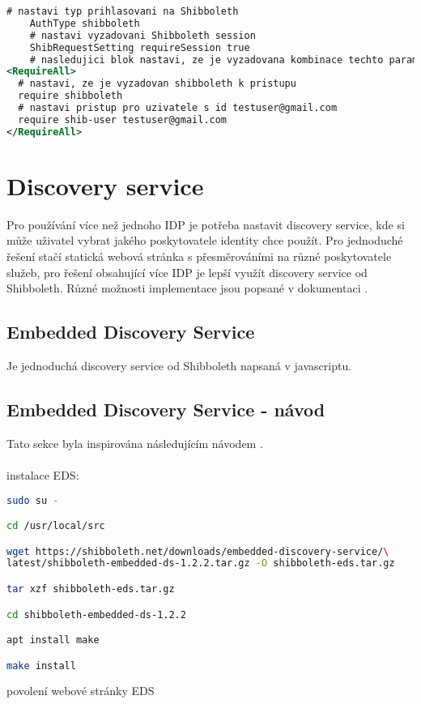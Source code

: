  \begin{lstlisting}[language=xml]
    # nastavi typ prihlasovani na Shibboleth
    AuthType shibboleth
    # nastavi vyzadovani Shibboleth session
    ShibRequestSetting requireSession true
    # nasledujici blok nastavi, ze je vyzadovana kombinace techto parametru
<RequireAll>
  # nastavi, ze je vyzadovan shibboleth k pristupu
  require shibboleth 
  # nastavi pristup pro uzivatele s id testuser@gmail.com
  require shib-user testuser@gmail.com 
</RequireAll>
    \end{lstlisting}


\section{Discovery service}
Pro používání více než jednoho IDP je potřeba nastavit discovery service, kde si může uživatel vybrat jakého poskytovatele identity chce použít. Pro jednoduché řešení stačí statická webová stránka s přesměrováními na různé poskytovatele služeb, pro řešení obsahující více IDP je lepší využít discovery service od Shibboleth. Různé možnosti implementace jsou popsané v dokumentaci \cite{IdPDiscovery}.

\subsection{Embedded Discovery Service}
Je jednoduchá discovery service od Shibboleth napsaná v javascriptu. 

\subsection{Embedded Discovery Service - návod}
Tato sekce byla inspirována následujícím návodem \cite{EDS-tut}. \\ \\
instalace EDS:
\begin{lstlisting}[language=Bash]
sudo su -

cd /usr/local/src

wget https://shibboleth.net/downloads/embedded-discovery-service/\
latest/shibboleth-embedded-ds-1.2.2.tar.gz -O shibboleth-eds.tar.gz

tar xzf shibboleth-eds.tar.gz

cd shibboleth-embedded-ds-1.2.2

apt install make

make install
\end{lstlisting}

povolení webové stránky EDS

